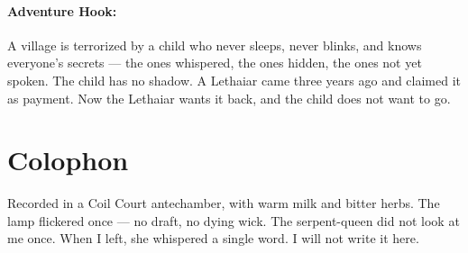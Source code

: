 \paragraph{Adventure Hook:}
A village is terrorized by a child who never sleeps, never blinks, and knows everyone's secrets --- the ones whispered, the ones hidden, the ones not yet spoken. The child has no shadow. A Lethaiar came three years ago and claimed it as payment. Now the Lethaiar wants it back, and the child does not want to go.

\section*{Colophon}
Recorded in a Coil Court antechamber, with warm milk and bitter herbs. The lamp flickered once --- no draft, no dying wick. The serpent-queen did not look at me once. When I left, she whispered a single word. I will not write it here.